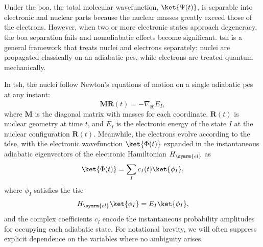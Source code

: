 \section{\filetotitle}\label{sec:quantum_amplitude_propagation_in_mixed_schemes}
Under the \acrfull{boa}, the total molecular wavefunction, $\ket{\Psi(t)}$, is separable into electronic and nuclear parts because the nuclear masses greatly exceed those of the electrons. However, when two or more electronic states approach degeneracy, the \acrshort{boa} separation fails and nonadiabatic effects become significant. \acrfull{tsh} is a general framework that treats nuclei and electrons separately: nuclei are propagated classically on an adiabatic \acrfull{pes}, while electrons are treated quantum mechanically.\supercite{10.1002/wcms.64,10.1063/1.4757762}

In \acrshort{tsh}, the nuclei follow Newton's equations of motion on a single adiabatic \acrshort{pes} at any instant:
\begin{equation}
\symbf{M}\ddot{\symbf{R}}(t)=-\nabla_{\symbf{R}}E_I,
\end{equation}
where $\symbf{M}$ is the diagonal matrix with masses for each coordinate, $\symbf{R}(t)$ is nuclear geometry at time $t$, and $E_I$ is the electronic energy of the state $I$ at the nuclear configuration $\symbf{R}(t)$. Meanwhile, the electrons evolve according to the \acrshort{tdse}, with the electronic wavefunction $\ket{\Phi(t)}$ expanded in the instantaneous adiabatic eigenvectors of the electronic Hamiltonian $H_{\symrm{el}}$ as
\begin{equation}
\ket{\Phi(t)}=\sum_I c_I(t)\ket{\phi_I},
\end{equation}
where $\phi_I$ satisfies the \acrfull{tise}
\begin{equation}
H_{\symrm{el}}\ket{\phi_I}=E_I\ket{\phi_I},
\end{equation}
and the complex coefficients $c_I$ encode the instantaneous probability amplitudes for occupying each adiabatic state. For notational brevity, we will often suppress explicit dependence on the variables where no ambiguity arises.

